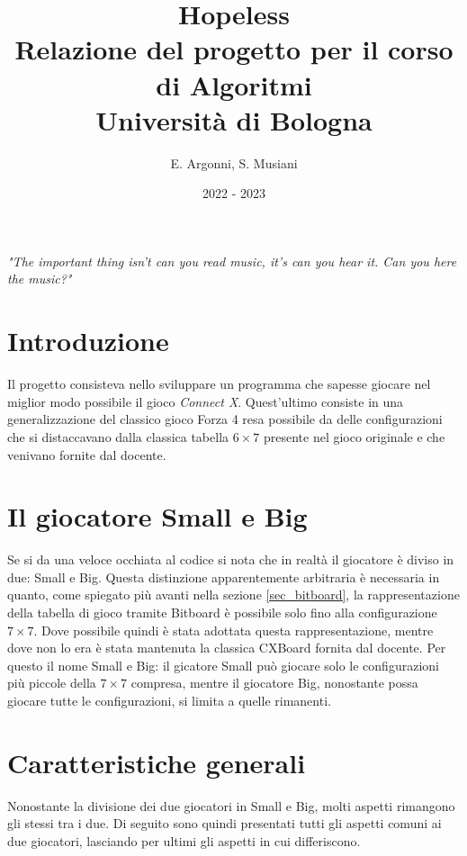 \documentclass[a4paper]{article}
\title{\textbf{Hopeless}\\
\vspace{0.2cm}\normalsize Relazione del progetto per il corso di Algoritmi\\
\normalsize Università di Bologna}
\author{
  E. Argonni,
  S. Musiani
}
\date{2022 - 2023}
\begin{document}
\maketitle

\vspace{1cm}
\textit{"The important thing isn't can you read music, it's can you hear it.
  Can you here the music?"}

\vfill

\section{Introduzione}

Il progetto consisteva nello sviluppare un programma che sapesse giocare nel 
miglior modo possibile il gioco \emph{Connect X}. Quest'ultimo consiste in una
generalizzazione del classico gioco Forza 4 resa possibile da delle 
configurazioni che si distaccavano dalla classica tabella $6 \times 7$ presente 
nel gioco originale e che venivano fornite dal docente.

\section{Il giocatore Small e Big}

Se si da una veloce occhiata al codice si nota che in realtà il giocatore è 
diviso in due: Small e Big. Questa distinzione apparentemente arbitraria è 
necessaria in quanto, come spiegato più avanti nella sezione \ref{sec_bitboard},
la rappresentazione della tabella di gioco tramite Bitboard è possibile solo 
fino alla configurazione $7 \times 7$. Dove possibile quindi è stata adottata 
questa rappresentazione, mentre dove non lo era è stata mantenuta la classica
CXBoard fornita dal docente. Per questo il nome Small e Big: il gicatore Small 
può giocare solo le configurazioni più piccole della $7 \times 7$ compresa, 
mentre il giocatore Big, nonostante possa giocare tutte le configurazioni, si 
limita a quelle rimanenti.

\section{Caratteristiche generali}

Nonostante la divisione dei due giocatori in Small e Big, molti aspetti 
rimangono gli stessi tra i due. Di seguito sono quindi presentati tutti gli 
aspetti comuni ai due giocatori, lasciando per ultimi gli aspetti in cui 
differiscono.
\end{document}
